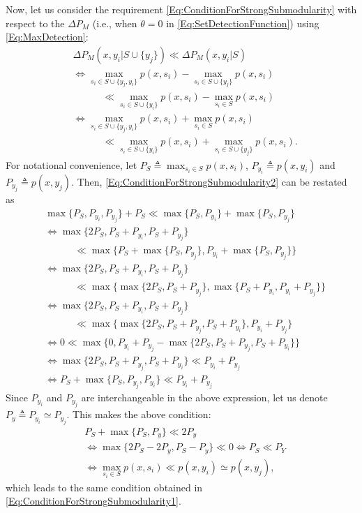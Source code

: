 \documentclass[letterpaper, 10 pt, conference]{ieeeconf}
\begin{document}
Now, let us consider the requirement \eqref{Eq:ConditionForStrongSubmodularity} with respect to the $\Delta P_M$ (i.e., when $\theta = 0$ in \eqref{Eq:SetDetectionFunction}) using \eqref{Eq:MaxDetection}:
\begin{align}
    &\Delta P_M(x,y_i \vert S \cup \{y_j\}) \ll \Delta P_M(x, y_i \vert S) \nonumber\\
    & \iff 
    \max_{s_i\in S\cup\{y_j,y_i\}} p(x,s_i) - \max_{s_i\in S\cup\{y_j\}} p(x,s_i) \nonumber \\
    &\quad \quad \quad \ll
    \max_{s_i\in S\cup\{y_i\}} p(x,s_i) - \max_{s_i\in S} p(x,s_i)\nonumber\\
    &\iff \max_{s_i\in S\cup\{y_j,y_i\}} p(x,s_i) + \max_{s_i\in S} p(x,s_i) 
    \nonumber\\ \label{Eq:ConditionForStrongSubmodularity2}
    &\quad \quad \quad \ll \max_{s_i\in S\cup\{y_i\}} p(x,s_i) + \max_{s_i\in S\cup\{y_j\}} p(x,s_i).
\end{align}
For notational convenience, let $P_S \triangleq \max_{s_i\in S} p(x,s_i)$, $P_{y_i}\triangleq p(x,y_i)$ and $P_{y_j}\triangleq p(x,y_j)$. Then, \eqref{Eq:ConditionForStrongSubmodularity2} can be restated as
\begin{align*}
    &\max\{P_S,P_{y_i},P_{y_j}\} + P_S \ll \max\{P_S,P_{y_i}\} + \max\{P_S,P_{y_j}\} \\
    &\iff 
    \max\{2P_S,P_S+P_{y_i},P_S+P_{y_j}\} \\ 
    &\quad \quad \quad \ll \max\{P_S+\max\{P_S,P_{y_j}\},P_{y_i}+\max\{P_S,P_{y_j}\}\}\\
    &\iff 
    \max\{2P_S,P_S+P_{y_i},P_S+P_{y_j}\} \\ 
    &\quad \quad \quad  \ll \max\{\max\{2P_S,P_S+P_{y_j}\},\max\{P_S+P_{y_i},P_{y_i}+P_{y_j}\}\}\\
    &\iff 
    \max\{2P_S,P_S+P_{y_i},P_S+P_{y_j}\} \\ 
    &\quad \quad \quad  \ll \max\{\max\{2P_S,P_S+P_{y_j},P_S+P_{y_i}\},P_{y_i}+P_{y_j}\}\\
    &\iff 
    0 \ll \max\{0,P_{y_i}+P_{y_j} - \max\{2P_S,P_S+P_{y_j},P_S+P_{y_i}\}\}\\
    &\iff \max\{2P_S,P_S+P_{y_j},P_S+P_{y_i}\} \ll  P_{y_i}+P_{y_j}\\
    &\iff P_S + \max\{P_S,P_{y_j},P_{y_i}\} \ll  P_{y_i}+P_{y_j}    
\end{align*}
Since $P_{y_i}$ and $P_{y_j}$ are interchangeable in the above expression, let us denote $P_y \triangleq P_{y_i} \simeq P_{y_j}$. This makes the above condition:
\begin{align}
&P_S + \max\{P_S,P_{y}\} \ll  2P_{y} \nonumber \\
&\iff     
\max\{2P_S-2P_y,P_S-P_y\} \ll 0  \iff P_S \ll P_Y  \nonumber \\
&\iff \max_{s_i \in S} p(x,s_i) \ll p(x,y_i) \simeq p(x,y_j), \nonumber
\end{align}
which leads to the same condition obtained in \eqref{Eq:ConditionForStrongSubmodularity1}.
\end{document}
